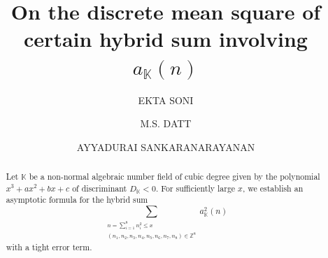 \documentclass[preprint,12pt]{elsarticle}
\numberwithin{equation}{section}
\begin{document}
	\begin{frontmatter}
	
	
	
	
	\title{On the discrete mean square of certain hybrid sum involving $a_{\mathbb{K}}(n)$}
	
	
	\author[label1]{EKTA SONI}
	\author[label2]{M.S. DATT}
	\author[label3]{AYYADURAI SANKARANARAYANAN}
	\begin{abstract}
	Let $\mathbb{K}$ be a non-normal algebraic number field of cubic degree given by the polynomial $x^{3}+ax^{2}+bx+c$ of discriminant $D_{\mathbb{K}}<0$. For sufficiently large $x$, we establish an asymptotic formula for the hybrid sum
$$\sum\limits_{\substack{n= \sum_{i=1}^{8}n_{i}^{2}\leq x\\ (n_{1},n_{2},n_{3},n_{4},n_{5},n_{6},n_{7},n_{8})\in \mathbb{Z}^{8}  }} a_{\mathbb{K}}^{2}(n)$$
with a tight error term.
\end{abstract}


\end{frontmatter}
\end{document}
